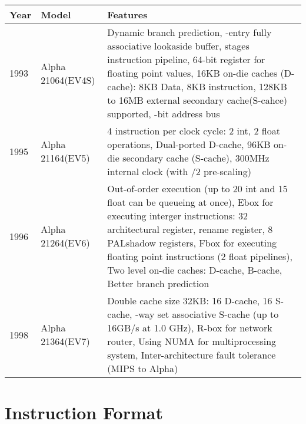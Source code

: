\documentclass[letterpaper,10pt,titlepage]{article}
\begin{document}
\begin{center}
   \begin{longtable}{l l p{10cm}}
      \textbf{Year} & \textbf{Model}      & \textbf{Features}\\ \hline

      1993 & Alpha 21064\newline(EV4S)  & Dynamic branch prediction,
      					  \newline
      					  32-entry fully associative lookaside buffer,
					  \newline
					  5 stages instruction pipeline,
				          \newline
					  32 64-bit register for floating point values,
					  \newline
					  16KB on-die caches (D-cache): 8KB Data, 
					  8KB instruction,
					  \newline
					  128KB to 16MB external secondary cache(S-cahce) supported,
					  \newline
					  34-bit address bus\\

      \hline
      1995 & Alpha 21164\newline(EV5)   & 4 instruction per clock cycle: 2 int, 2 float operations,
      					  \newline
					  Dual-ported D-cache,
					  \newline
					  96KB on-die secondary cache (S-cache),
					  \newline
					  300MHz internal clock (with /2 pre-scaling)\\
      \hline
      1996 & Alpha 21264\newline(EV6)   & Out-of-order execution (up to 20 int and 15 float can be
      					  queueing at once), 
					  \newline
					  Ebox for executing interger instructions: 32 architectural register,
					  \newline
					  40 rename register, 8 PALshadow registers,
					  \newline
					  Fbox for executing floating point instructions (2 float pipelines),
					  \newline
					  Two level on-die caches: D-cache, B-cache,
					  \newline
					  Better branch prediction\\
      \hline
      1998& Alpha 21364\newline(EV7)   &  Double cache size 32KB: 16 D-cache, 16 S-cache,
      					  \newline
					  7-way set associative S-cache (up to 16GB/s at 1.0 GHz),
					  \newline
					  R-box for network router, Using NUMA for multiprocessing system,
					  \newline
					  Inter-architecture fault tolerance (MIPS to Alpha)\\
      \hline
   \end{longtable}
\end{center}



\section{Instruction Format}

\newpage
\nocite{*}


\end{document}
